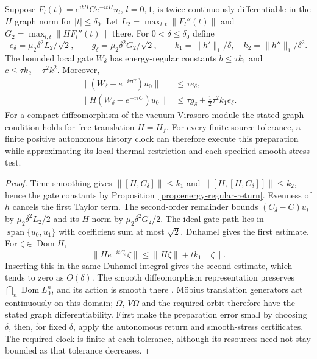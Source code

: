 \begin{proposition}
\label{prop:local-thermal-preparation}
Suppose $F_l(t)=e^{itH}Ce^{-itH}u_l$, $l=0,1$, is twice continuously
differentiable in the $H$ graph norm for $|t|\le\delta_0$.
Let $L_2=\max_{l,t}\|F_l''(t)\|$ and
$G_2=\max_{l,t}\|HF_l''(t)\|$ there. For $0<\delta\le\delta_0$ define
\[
 e_\delta=\mu_2\delta^2L_2/\sqrt2,\qquad
 g_\delta=\mu_2\delta^2G_2/\sqrt2,\qquad
 k_1=\|h'\|_1/\delta,\quad k_2=\|h''\|_1/\delta^2.
\]
The bounded local gate $W_\delta$ has energy-regular constants
$b\le\tau k_1$ and $c\le\tau k_2+\tau^2k_1^2$. Moreover,
\begin{align}
 \|(W_\delta-e^{-i\tau C})u_0\|&\le\tau e_\delta,\nonumber\\
 \|H(W_\delta-e^{-i\tau C})u_0\|
   &\le\tau g_\delta+\tfrac12\tau^2k_1e_\delta.
                      \label{eq:local-preparation-graph}
\end{align}
For a compact diffeomorphism of the vacuum Virasoro module the stated
graph condition holds for free translation $H=H_f$.
For every finite source tolerance, a finite positive autonomous
history clock can therefore execute this preparation while approximating
its local thermal restriction and each specified smooth stress test.
\end{proposition}
\begin{proof}
Time smoothing gives $\|[H,C_\delta]\|\le k_1$ and
$\|[H,[H,C_\delta]]\|\le k_2$, hence the gate constants by
Proposition~\ref{prop:energy-regular-return}.
Evenness of $h$ cancels the first Taylor term. The second-order
remainder bounds $(C_\delta-C)u_l$ by
$\mu_2\delta^2L_2/2$ and its $H$ norm by
$\mu_2\delta^2G_2/2$. The ideal gate path lies in
$\operatorname{span}\{u_0,u_1\}$ with coefficient sum at most
$\sqrt2$. Duhamel gives the first estimate.
For $\zeta\in\operatorname{Dom}H$,
\[
 \|H e^{-itC_\delta}\zeta\|
       \le\|H\zeta\|+t k_1\|\zeta\|.
\]
Inserting this in the same Duhamel integral gives the second estimate,
which tends to zero as $O(\delta)$.
The smooth diffeomorphism representation preserves
$\bigcap_n\operatorname{Dom}L_0^n$, and its action is smooth there
\cite[Sections~5.1--5.2, Proposition~5.1]{FewsterHollands2005}.
M\"obius translation generators act continuously on this domain;
$\Omega$, $V\Omega$ and the required orbit therefore have the stated
graph differentiability. First make the preparation error small by
choosing $\delta$, then, for fixed $\delta$, apply the autonomous
return and smooth-stress certificates. The required clock is finite
at each tolerance, although its resources need not stay bounded as
that tolerance decreases.
\end{proof}

